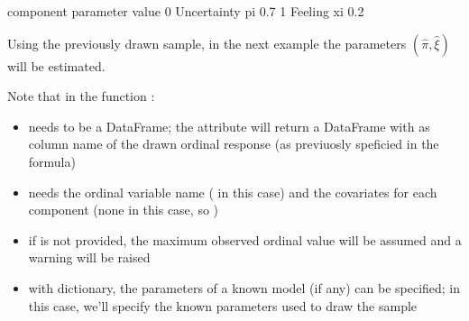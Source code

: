 \documentclass[letterpaper,10pt,english]{sphinxmanual}
\begin{document}
\begin{sphinxVerbatim}[commandchars=\\\{\}]
     component parameter  value
0  Uncertainty        pi    0.7
1      Feeling        xi    0.2
\end{sphinxVerbatim}

\sphinxAtStartPar
Using the previously drawn sample, in the next example the parameters \((\hat\pi, \hat\xi)\) will be estimated.

\sphinxAtStartPar
Note that in the function :
\begin{itemize}
\item {} 
\sphinxAtStartPar
{} needs to be a  DataFrame; the attribute  will return a DataFrame with  as column name of the drawn ordinal response (as previuosly speficied in the formula)

\item {} 
\sphinxAtStartPar
{} needs the ordinal variable name ( in this case) and the covariates for each component (none in this case, so )

\item {} 
\sphinxAtStartPar
if  is not provided, the maximum observed ordinal value will be assumed and a warning will be raised

\item {} 
\sphinxAtStartPar
with  dictionary, the parameters of a known model (if any) can be specified; in this case, we’ll specify the known parameters used to draw the sample

\end{itemize}
\def\sphinxLiteralBlockLabel{\label{\detokenize{manual:id41}}}
\begin{sphinxVerbatim}[commandchars=\\\{\},numbers=left,firstnumber=1,stepnumber=1]
  
         \PYG{p}{[}\PYG{p}{]}
         \PYG{p}{[}\PYG{p}{]}
\end{sphinxVerbatim}
\end{document}
